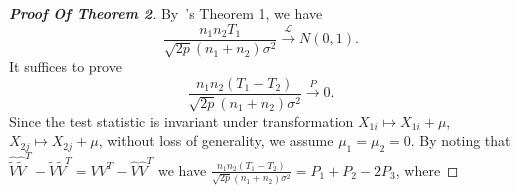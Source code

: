 
\begin{proof}[\textbf{Proof Of Theorem 2}]
    By~\cite{Chen2010A}'s Theorem 1, we have
    \begin{equation*}
        \frac{n_1 n_2 T_1}{\sqrt{2p}(n_1+n_2)\sigma^2}\xrightarrow{\mathcal{L}}N(0,1).
    \end{equation*}
    It suffices to prove
\begin{equation*}
\frac{n_1n_2(T_1-T_2)}{\sqrt{2p}(n_1+n_2)\sigma^2}\xrightarrow{P}0.
\end{equation*}
Since the test statistic is invariant under transformation $X_{1i}\mapsto X_{1i}+\mu$, $X_{2j}\mapsto X_{2j}+\mu$, without loss of generality, we assume $\mu_1=\mu_2=0$.
By noting that $\hat{\tilde{V}}\hat{\tilde{V}}^T -\tilde{V}\tilde{V}^T =VV^T -\hat{V}\hat{V}^T $ we have $\frac{n_1n_2(T_1-T_2)}{\sqrt{2p}(n_1+n_2)\sigma^2}=P_1+P_2-2P_3$, where


\end{proof}
